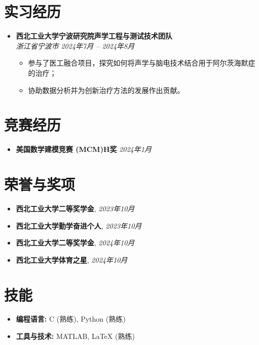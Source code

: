 \documentclass[a4paper,10pt]{article}
\begin{document}
\section*{实习经历}
\begin{itemize}[leftmargin=0.5cm]
	\item \textbf{西北工业大学宁波研究院声学工程与测试技术团队} \\ 
	\textit{浙江省宁波市} \hfill \textit{2024年7月 -- 2024年8月} 
	
	\begin{itemize}
		\item 参与了医工融合项目，探究如何将声学与脑电技术结合用于阿尔茨海默症的治疗；
		\item 协助数据分析并为创新治疗方法的发展作出贡献。
	\end{itemize}
\end{itemize}

\section*{竞赛经历}
\begin{itemize}[leftmargin=0.5cm]
    \item \textbf{美国数学建模竞赛 (MCM)H奖} \hfill \textit{2024年1月}
\end{itemize}

\section*{荣誉与奖项}
\begin{itemize}[leftmargin=0.5cm]
    \item \textbf{西北工业大学二等奖学金}, \hfill \textit{2023年10月} 
    \item \textbf{西北工业大学勤学奋进个人}, \hfill \textit{2023年10月} 
    \item \textbf{西北工业大学二等奖学金}, \hfill \textit{2024年10月}
    \item \textbf{西北工业大学体育之星}, \hfill \textit{2024年10月}
\end{itemize}

\section*{技能}
\begin{itemize}[leftmargin=0.5cm]
    \item \textbf{编程语言:} C (熟练), Python (熟练)
    \item \textbf{工具与技术:} MATLAB, LaTeX (熟练)
\end{itemize}
\end{document}
